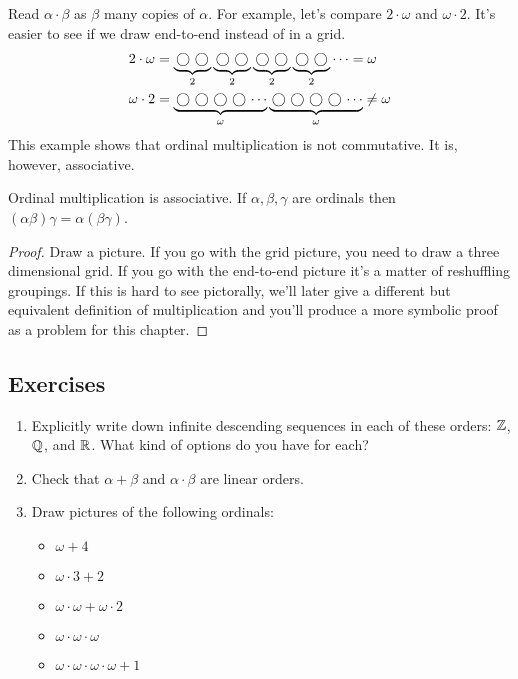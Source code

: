 \documentclass[10pt]{amsart}
\begin{document}
Read $\alpha \cdot \beta$ as $\beta$ many copies of $\alpha$. For example, let's compare $2 \cdot \omega$ and $\omega \cdot 2$. It's easier to see if we draw end-to-end instead of in a grid.
\begin{align*}
2 \cdot \omega &= \underbrace{\mathord{\,\bigcirc\,} \mathord{\,\bigcirc\,}}_2 \underbrace{\mathord{\,\bigcirc\,} \mathord{\,\bigcirc\,}}_2 \underbrace{\mathord{\,\bigcirc\,} \mathord{\,\bigcirc\,}}_2 \underbrace{\mathord{\,\bigcirc\,} \mathord{\,\bigcirc\,}}_2 \cdots = \omega \\
\omega \cdot 2 &= \underbrace{\mathord{\,\bigcirc\,} \mathord{\,\bigcirc\,} \mathord{\,\bigcirc\,} \mathord{\,\bigcirc\,} \cdots }_\omega \underbrace{\mathord{\,\bigcirc\,} \mathord{\,\bigcirc\,} \mathord{\,\bigcirc\,} \mathord{\,\bigcirc\,} \cdots }_\omega \ne \omega
\end{align*}
This example shows that ordinal multiplication is not commutative. It is, however, associative.

\begin{proposition}
Ordinal multiplication is associative. If $\alpha,\beta,\gamma$ are ordinals then $(\alpha\beta)\gamma = \alpha(\beta\gamma)$.
\end{proposition}

\begin{proof}
Draw a picture. If you go with the grid picture, you need to draw a three dimensional grid. If you go with the end-to-end picture it's a matter of reshuffling groupings. If this is hard to see pictorally, we'll later give a different but equivalent definition of multiplication and you'll produce a more symbolic proof as a problem for this chapter.
\end{proof}

\subsection*{Exercises}

\begin{enumerate}
\item Explicitly write down infinite descending sequences in each of these orders: $\mathbb{Z}$, $\mathbb{Q}$, and $\mathbb{R}$. What kind of options do you have for each?
\item Check that $\alpha + \beta$ and $\alpha \cdot \beta$ are linear orders.
\item Draw pictures of the following ordinals:
  \begin{itemize}
  \item $\omega + 4$
  \item $\omega \cdot 3 + 2$
  \item $\omega \cdot \omega + \omega \cdot 2$
  \item $\omega \cdot \omega \cdot \omega$
  \item $\omega \cdot \omega \cdot \omega \cdot \omega + 1$
  \end{itemize}
\end{enumerate}
\end{document}
